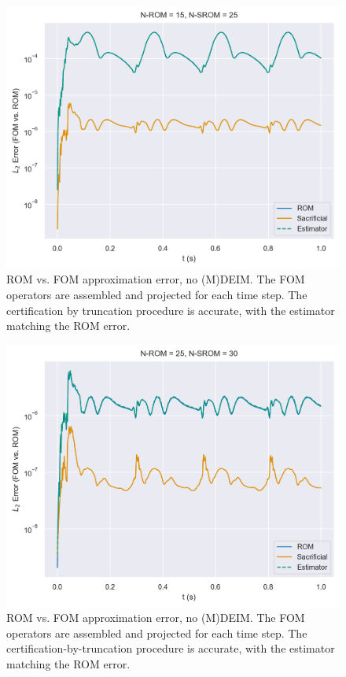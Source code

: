 \documentclass[../../thesis.tex]{subfiles}
\begin{document}
\clearpage
\begin{figure}[h]
    \includegraphics[width =\columnwidth]{research_project/piston/figures/nonlinear_displacement/truncation_error/no_deim/error_estimation_rom_15_srom_25_0.png}
    \caption{ROM vs. FOM approximation error, no (M)DEIM.
    The FOM operators are assembled and projected for each time step.
    The certification by truncation procedure is accurate, with the estimator matching the ROM error.}
    \label{fig:nlinear_disp_no_deim_errors_above_threshold}
\end{figure}

\begin{figure}[h]
    \includegraphics[width =\columnwidth]{research_project/piston/figures/nonlinear_displacement/truncation_error/no_deim/error_estimation_rom_25_srom_30_0.png}
    \caption{ROM vs. FOM approximation error, no (M)DEIM.
    The FOM operators are assembled and projected for each time step.
    The certification-by-truncation procedure is accurate, 
    with the estimator matching the ROM error.}
    \label{fig:nlinear_disp_no_deim_errors_below_threshold}
\end{figure}
\end{document}
